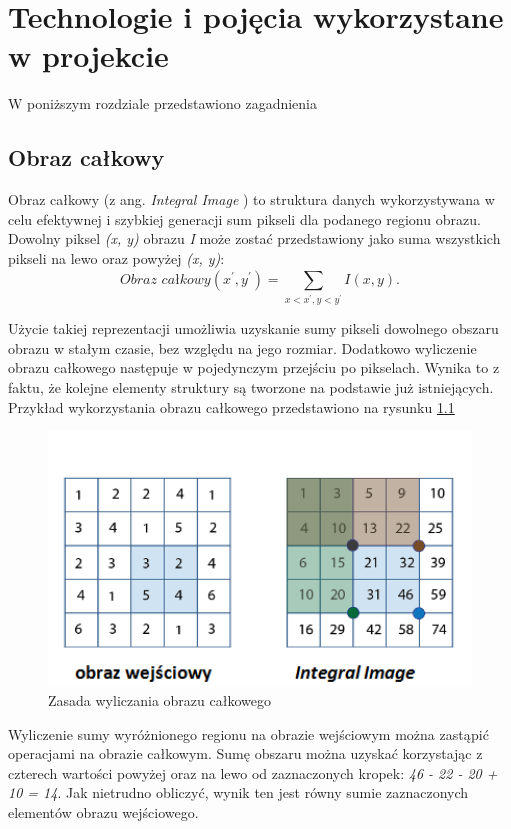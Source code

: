 \chapter{Technologie i pojęcia wykorzystane w projekcie  }
\label{cha:Technologie}
W poniższym rozdziale przedstawiono zagadnienia 

\section{Obraz całkowy}
\label{sec:IntegralImage}
Obraz całkowy (z ang. \textit{Integral Image} \cite{ViolaJonesIntegralImage}) to struktura danych wykorzystywana w celu efektywnej i szybkiej generacji sum pikseli dla podanego regionu obrazu. Dowolny piksel \textit{(x, y)} obrazu \textit{I} może zostać przedstawiony jako suma wszystkich pikseli na lewo oraz powyżej \textit{(x, y)}:
\begin{equation}
\textit{Obraz całkowy}(x^{'},y^{'}) = \sum_{x<x^{'},y<y^{'}}^{}I(x,y).
\end{equation}

Użycie takiej reprezentacji umożliwia uzyskanie sumy pikseli dowolnego obszaru obrazu w stałym czasie, bez względu na jego rozmiar. Dodatkowo wyliczenie obrazu całkowego następuje w pojedynczym przejściu po pikselach. Wynika to z faktu, że kolejne elementy struktury są tworzone na podstawie już istniejących. Przykład wykorzystania obrazu całkowego  przedstawiono na rysunku \ref{im: Integral Image} 

\begin{figure}[h]
	\includegraphics[width=12cm]{integral_image}
	\centering
	\caption{Zasada wyliczania obrazu całkowego}
	\label{im: Integral Image}
\end{figure}    

Wyliczenie sumy wyróżnionego regionu na obrazie wejściowym można zastąpić operacjami na obrazie całkowym. Sumę obszaru można uzyskać korzystając z czterech wartości powyżej oraz na lewo od zaznaczonych kropek: \textit{46 - 22 - 20 + 10 = 14}. Jak nietrudno obliczyć, wynik ten jest równy sumie zaznaczonych elementów obrazu wejściowego.

